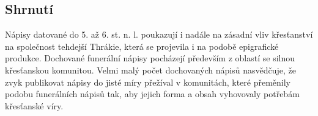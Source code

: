 
\subsection[shrnutí-24]{Shrnutí}

Nápisy datované do 5. až 6. st. n. l. poukazují i nadále na zásadní vliv křesťanství na společnost tehdejší Thrákie, která se projevila i na podobě epigrafické produkce. Dochované funerální nápisy pocházejí především z oblastí se silnou křesťanskou komunitou. Velmi malý počet dochovaných nápisů nasvědčuje, že zvyk publikovat nápisy do jisté míry přežíval v komunitách, které přeměnily podobu funerálních nápisů tak, aby jejich forma a obsah vyhovovaly potřebám křesťanské víry.

